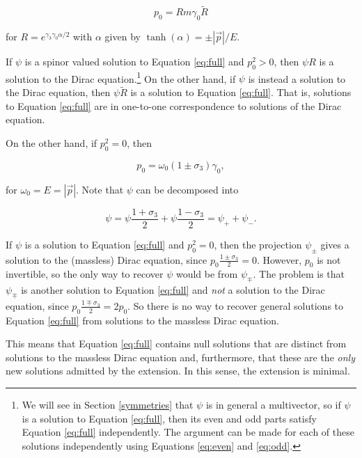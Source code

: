 \documentclass{article}
\begin{document}
  \begin{equation}
    p_0 = R m \gamma_0 \widetilde R\label{eq:R}
  \end{equation} 

   for $R = e^{\gamma_3 \gamma_0 \alpha/2}$ with $\alpha$ given by $\tanh(\alpha) = \pm |\vec p|/E$. 

   If $\psi$ is a spinor valued solution to Equation \ref{eq:full} and $p_0^2 > 0$, then $\psi R$ is a solution to the Dirac equation.\footnote{We will see in Section \ref{symmetries} that $\psi$ is in general a multivector, so if $\psi$ is a solution to Equation \ref{eq:full}, then its even and odd parts satisfy Equation \ref{eq:full} independently. The argument can be made for each of these solutions independently using Equations \ref{eq:even} and \ref{eq:odd}.} On the other hand, if $\psi$ is instead a solution to the Dirac equation, then $\psi \widetilde R$ is a solution to Equation \ref{eq:full}. That is, solutions to Equation \ref{eq:full} are in one-to-one correspondence to solutions of the Dirac equation.

   On the other hand, if $p_0^2 = 0$, then

  \begin{equation}
    p_0 = \omega_0 (1 \pm \sigma_3) \gamma_0, \label{eq:massless}
  \end{equation}

  for $\omega_0 = E = |\vec p|$. Note that $\psi$ can be decomposed into 

  \begin{equation}
    \psi = \psi \frac{1 + \sigma_3}{2} + \psi \frac{1 - \sigma_3}{2} = \psi_+ + \psi_-.
  \end{equation}

  If $\psi$ is a solution to Equation \ref{eq:full} and $p_0^2 = 0$, then the projection $\psi_\pm$ gives a solution to the (massless) Dirac equation, since $p_0 \frac{1 \pm \sigma_3}{2} = 0$. However, $p_0$ is not invertible, so the only way to recover $\psi$ would be from $\psi_\mp$. The problem is that $\psi_\mp$ is another solution to Equation \ref{eq:full} and \emph{not} a solution to the Dirac equation, since $p_0 \frac{1 \mp \sigma_3}{2} = 2 p_0$. So there is no way to recover general solutions to Equation \ref{eq:full} from solutions to the massless Dirac equation. 

  This means that Equation \ref{eq:full} contains null solutions that are distinct from solutions to the massless Dirac equation and, furthermore, that these are the \emph{only} new solutions admitted by the extension. In this sense, the extension is minimal.
\end{document}
